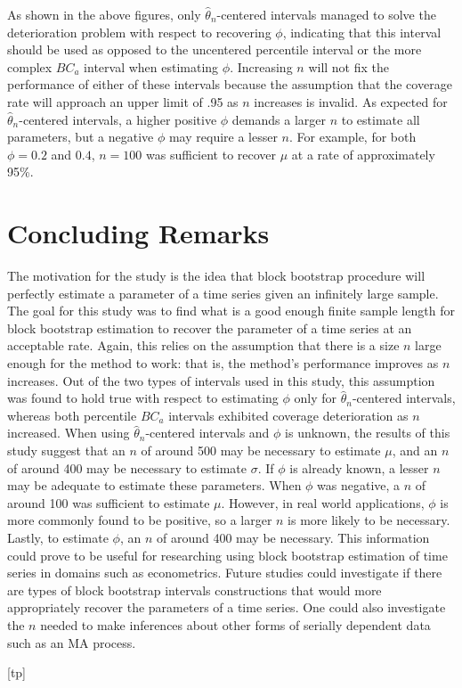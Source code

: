 \documentclass[12pt, letterpaper, titlepage]{article}
\begin{document}
As shown in the above figures, only $\hat{\theta}_{n}$-centered intervals
managed to solve the deterioration problem with respect to recovering $\phi$,
indicating that this interval should be used as opposed to the uncentered
percentile interval or the more complex $BC_a$ interval when estimating
$\phi$. Increasing $n$ will not fix the performance of either of these
intervals because the assumption that the coverage rate will approach an upper
limit of .95 as $n$ increases is invalid. As expected for
$\hat{\theta}_{n}$-centered intervals, a higher positive $\phi$ demands a
larger $n$ to estimate all parameters, but a negative $\phi$ may require a
lesser $n$. For example, for both $\phi = 0.2$ and $0.4$, $n = 100$ was
sufficient to recover $\mu$ at a rate of approximately 95\%.


\section{Concluding Remarks}
\label{sec:conremarks}

The motivation for the study is the idea that block bootstrap procedure will
perfectly estimate a parameter of a time series given an infinitely large
sample. The goal for this study was to find what is a good enough finite
sample length for block bootstrap estimation to recover the parameter of a
time series at an acceptable rate. Again, this relies on the assumption that
there is a size $n$ large enough for the method to work: that is, the method's
performance improves as $n$ increases. Out of the two types of intervals used
in this study, this assumption was found to hold true with respect to
estimating $\phi$ only for $\hat{\theta}_{n}$-centered intervals, whereas both
percentile $BC_a$ intervals exhibited coverage deterioration as $n$
increased. When using $\hat{\theta}_{n}$-centered intervals and $\phi$ is
unknown, the results of this study suggest that an $n$ of around 500 may be
necessary to estimate $\mu$, and an $n$ of around 400 may be necessary to
estimate $\sigma$. If $\phi$ is already known, a lesser $n$ may be adequate to
estimate these parameters. When $\phi$ was negative, a $n$ of around 100 was
sufficient to estimate $\mu$. However, in real world applications, $\phi$ is
more commonly found to be positive, so a larger $n$ is more likely to be
necessary. Lastly, to estimate $\phi$, an $n$ of around 400 may be necessary.
This information could prove to be useful for researching using block bootstrap
estimation of time series in domains such as econometrics. Future studies
could investigate if there are types of block bootstrap intervals
constructions that would more appropriately recover the parameters of a time
series. One could also investigate the $n$ needed to make inferences about
other forms of serially dependent data such as an MA process.



[tp]
\end{document}
